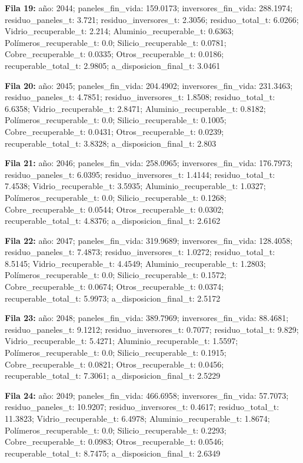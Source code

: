 {\footnotesize\textbf{Fila 19:} año: 2044; paneles\_fin\_vida: 159.0173; inversores\_fin\_vida: 288.1974; residuo\_paneles\_t: 3.721; residuo\_inversores\_t: 2.3056; residuo\_total\_t: 6.0266; Vidrio\_recuperable\_t: 2.214; Aluminio\_recuperable\_t: 0.6363; Polímeros\_recuperable\_t: 0.0; Silicio\_recuperable\_t: 0.0781; Cobre\_recuperable\_t: 0.0335; Otros\_recuperable\_t: 0.0186; recuperable\_total\_t: 2.9805; a\_disposicion\_final\_t: 3.0461\par}
{\footnotesize\textbf{Fila 20:} año: 2045; paneles\_fin\_vida: 204.4902; inversores\_fin\_vida: 231.3463; residuo\_paneles\_t: 4.7851; residuo\_inversores\_t: 1.8508; residuo\_total\_t: 6.6358; Vidrio\_recuperable\_t: 2.8471; Aluminio\_recuperable\_t: 0.8182; Polímeros\_recuperable\_t: 0.0; Silicio\_recuperable\_t: 0.1005; Cobre\_recuperable\_t: 0.0431; Otros\_recuperable\_t: 0.0239; recuperable\_total\_t: 3.8328; a\_disposicion\_final\_t: 2.803\par}
{\footnotesize\textbf{Fila 21:} año: 2046; paneles\_fin\_vida: 258.0965; inversores\_fin\_vida: 176.7973; residuo\_paneles\_t: 6.0395; residuo\_inversores\_t: 1.4144; residuo\_total\_t: 7.4538; Vidrio\_recuperable\_t: 3.5935; Aluminio\_recuperable\_t: 1.0327; Polímeros\_recuperable\_t: 0.0; Silicio\_recuperable\_t: 0.1268; Cobre\_recuperable\_t: 0.0544; Otros\_recuperable\_t: 0.0302; recuperable\_total\_t: 4.8376; a\_disposicion\_final\_t: 2.6162\par}
{\footnotesize\textbf{Fila 22:} año: 2047; paneles\_fin\_vida: 319.9689; inversores\_fin\_vida: 128.4058; residuo\_paneles\_t: 7.4873; residuo\_inversores\_t: 1.0272; residuo\_total\_t: 8.5145; Vidrio\_recuperable\_t: 4.4549; Aluminio\_recuperable\_t: 1.2803; Polímeros\_recuperable\_t: 0.0; Silicio\_recuperable\_t: 0.1572; Cobre\_recuperable\_t: 0.0674; Otros\_recuperable\_t: 0.0374; recuperable\_total\_t: 5.9973; a\_disposicion\_final\_t: 2.5172\par}
{\footnotesize\textbf{Fila 23:} año: 2048; paneles\_fin\_vida: 389.7969; inversores\_fin\_vida: 88.4681; residuo\_paneles\_t: 9.1212; residuo\_inversores\_t: 0.7077; residuo\_total\_t: 9.829; Vidrio\_recuperable\_t: 5.4271; Aluminio\_recuperable\_t: 1.5597; Polímeros\_recuperable\_t: 0.0; Silicio\_recuperable\_t: 0.1915; Cobre\_recuperable\_t: 0.0821; Otros\_recuperable\_t: 0.0456; recuperable\_total\_t: 7.3061; a\_disposicion\_final\_t: 2.5229\par}
{\footnotesize\textbf{Fila 24:} año: 2049; paneles\_fin\_vida: 466.6958; inversores\_fin\_vida: 57.7073; residuo\_paneles\_t: 10.9207; residuo\_inversores\_t: 0.4617; residuo\_total\_t: 11.3823; Vidrio\_recuperable\_t: 6.4978; Aluminio\_recuperable\_t: 1.8674; Polímeros\_recuperable\_t: 0.0; Silicio\_recuperable\_t: 0.2293; Cobre\_recuperable\_t: 0.0983; Otros\_recuperable\_t: 0.0546; recuperable\_total\_t: 8.7475; a\_disposicion\_final\_t: 2.6349\par}
